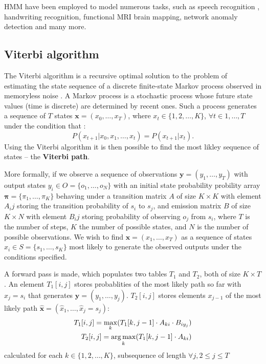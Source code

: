 HMM have been employed to model numerous tasks, such as 
speech recognition \citep{schuller2003hidden},
handwriting recognition, functional MRI brain mapping,  network anomaly
detection \citep{yu2010hidden} and many more.

\subsection{Viterbi algorithm}
\label{sec:viterbi}

The Viterbi algorithm is a recursive optimal solution to the problem of
estimating the state sequence of a discrete finite-state Markov process
\citep{howard1960dynamic} observed in memoryless noise
\citep{forney1973viterbi}. A Markov process is a stochastic process
whose future state values (time is discrete) are determined by
recent ones. Such a process generates a sequence of $T$ states 
$\textbf{x} = (x_0, \dots, x_T)$, where 
$x_t \in \{1, 2, \dots, K\}$, $\forall t \in {1, \dots, T}$
under the condition that :
$$
P(x_{t + 1} | x_0, x_1,\dots,x_t) = P(x_{t + 1} | x_t).
$$
Using the Viterbi algorithm it is then possible 
to find the most likley sequence of states -- 
the \textbf{Viterbi path}.

More formally, if we observe a sequence of
observations $\textbf{y} = (y_1, \dots, y_T)$ with output states
$y_i \in O = \{o_1, \dots, o_N\}$ with an initial state probability
probility array $\bm{\pi} = \{\pi_1,\dots, \pi_K\}$
behaving under a transition matrix $A$ of size $K \times K$
with element $A_ij$ storing the transition probability of
$s_i$ to $s_j$, 
and emission matrix $B$ of size $K \times N$ with 
element $B_ij$ storing probability of observing $o_j$ from $s_i$,
where $T$ is the number of steps, 
$K$ the number of possible states, and $N$ is the number of 
possible observations. We wish to find
$\textbf{x} = (x_1, \dots, x_T)$
as a sequence of states $x_i \in S = \{s_1, \dots, s_K\}$ 
most likely to generate the observed outputs under the 
conditions specified. 

A forward pass is made, which populates two
tables $T_1$ and $T_2$, both of size
$K \times T$. An element $T_1[i, j]$ stores 
probablities of the most likely path so far with 
$x_j = s_i$ that generates $\textbf{y} = (y_1, \dots, y_j)$.
$T_2[i, j]$ stores elements $x_{j - 1}$ of the most
likely path $\bm{\hat{x}} = (\hat{x}_1, \dots, \hat{x}_j = s_j)$:
\begin{align*}
T_1[i, j] = \max_k (T_1[k, j - 1] \cdot A_{ki} \cdot B_{iy_j}) \\
T_2[i, j] = \operatorname*{arg\,max}_k (T_1[k, j - 1] \cdot A_{ki})
\end{align*}
calculated for each $k \in \{1, 2, \dots, K\}$, subsequence
of length $\forall j, 2 \leq j \leq T$

